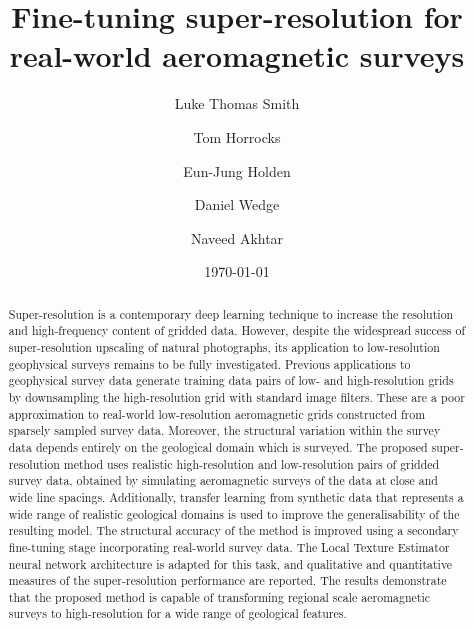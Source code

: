 % 
% 

\title{Fine-tuning super-resolution for real-world aeromagnetic surveys}
\author[1*]{Luke Thomas Smith}
\author[1]{Tom Horrocks}
\author[1]{Eun-Jung Holden}
\author[1]{Daniel Wedge}
\author[2]{Naveed Akhtar}
\date{\today}

\begin{abstract}
    Super-resolution is a contemporary deep learning technique to increase the resolution and high-frequency content of gridded data.
    However, despite the widespread success of super-resolution upscaling of natural photographs, its application to low-resolution geophysical surveys remains to be fully investigated.
    Previous applications to geophysical survey data generate training data pairs of low- and high-resolution grids by downsampling the high-resolution grid with standard image filters.
    These are a poor approximation to real-world low-resolution aeromagnetic grids constructed from sparsely sampled survey data.
    Moreover, the structural variation within the survey data depends entirely on the geological domain which is surveyed.
    The proposed super-resolution method uses realistic high-resolution and low-resolution pairs of gridded survey data, obtained by simulating aeromagnetic surveys of the data at close and wide line spacings.
    Additionally, transfer learning from synthetic data that represents a wide range of realistic geological domains is used to improve the generalisability of the resulting model.
    The structural accuracy of the method is improved using a secondary fine-tuning stage incorporating real-world survey data.
    The Local Texture Estimator neural network architecture is adapted for this task, and qualitative and quantitative measures of the super-resolution performance are reported.
    The results demonstrate that the proposed method is capable of transforming regional scale aeromagnetic surveys to high-resolution for a wide range of geological features.
\end{abstract}

